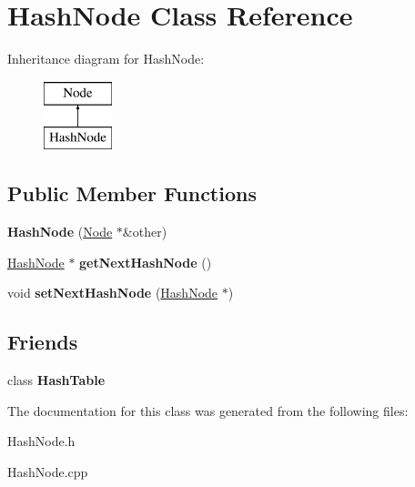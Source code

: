 \hypertarget{class_hash_node}{\section{Hash\+Node Class Reference}
\label{class_hash_node}
}
Inheritance diagram for Hash\+Node\+:\begin{figure}[H]
\begin{center}
\leavevmode
\includegraphics[height=2.000000cm]{class_hash_node}
\end{center}
\end{figure}
\subsection*{Public Member Functions}
\begin{DoxyCompactItemize}
\item 
\hypertarget{class_hash_node_af85be330cc34bb55f26041c7224b5b25}{{\bfseries Hash\+Node} (\hyperlink{class_node}{Node} $\ast$\&other)}\label{class_hash_node_af85be330cc34bb55f26041c7224b5b25}

\item 
\hypertarget{class_hash_node_ae3a3c1f03c060e03cc01ef81aae2c734}{\hyperlink{class_hash_node}{Hash\+Node} $\ast$ {\bfseries get\+Next\+Hash\+Node} ()}\label{class_hash_node_ae3a3c1f03c060e03cc01ef81aae2c734}

\item 
\hypertarget{class_hash_node_a0711b28c4cbdb8a21e6df486896081b3}{void {\bfseries set\+Next\+Hash\+Node} (\hyperlink{class_hash_node}{Hash\+Node} $\ast$)}\label{class_hash_node_a0711b28c4cbdb8a21e6df486896081b3}

\end{DoxyCompactItemize}
\subsection*{Friends}
\begin{DoxyCompactItemize}
\item 
\hypertarget{class_hash_node_a574ea806a7ec4e2f0fa54ed7da67b628}{class {\bfseries Hash\+Table}}\label{class_hash_node_a574ea806a7ec4e2f0fa54ed7da67b628}

\end{DoxyCompactItemize}


The documentation for this class was generated from the following files\+:\begin{DoxyCompactItemize}
\item 
Hash\+Node.\+h\item 
Hash\+Node.\+cpp\end{DoxyCompactItemize}
